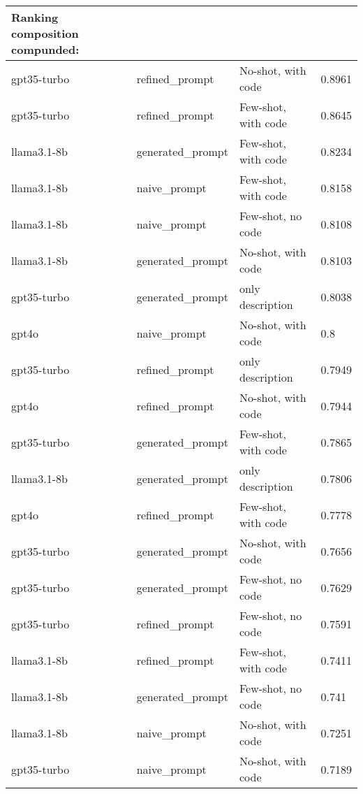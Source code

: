 \documentclass[a4paper,11pt,oneside]{memoir}
\begin{document}
\begin{table}[!ht]
    \centering
    \begin{tabular}{|l|l|l|l|}
    \hline
        Ranking composition compunded: & ~ & ~ & ~ \\ \hline
        gpt35-turbo &  refined\_prompt &  No-shot, with code & 0.8961 \\ \hline
        gpt35-turbo &  refined\_prompt &  Few-shot, with code & 0.8645 \\ \hline
        llama3.1-8b &  generated\_prompt &  Few-shot, with code & 0.8234 \\ \hline
        llama3.1-8b &  naive\_prompt &  Few-shot, with code & 0.8158 \\ \hline
        llama3.1-8b &  naive\_prompt &  Few-shot, no code & 0.8108 \\ \hline
        llama3.1-8b &  generated\_prompt &  No-shot, with code & 0.8103 \\ \hline
        gpt35-turbo &  generated\_prompt &  only description & 0.8038 \\ \hline
        gpt4o &  naive\_prompt &  No-shot, with code & 0.8 \\ \hline
        gpt35-turbo &  refined\_prompt &  only description & 0.7949 \\ \hline
        gpt4o &  refined\_prompt &  No-shot, with code & 0.7944 \\ \hline
        gpt35-turbo &  generated\_prompt &  Few-shot, with code & 0.7865 \\ \hline
        llama3.1-8b &  generated\_prompt &  only description & 0.7806 \\ \hline
        gpt4o &  refined\_prompt &  Few-shot, with code & 0.7778 \\ \hline
        gpt35-turbo &  generated\_prompt &  No-shot, with code & 0.7656 \\ \hline
        gpt35-turbo &  generated\_prompt &  Few-shot, no code & 0.7629 \\ \hline
        gpt35-turbo &  refined\_prompt &  Few-shot, no code & 0.7591 \\ \hline
        llama3.1-8b &  refined\_prompt &  Few-shot, with code & 0.7411 \\ \hline
        llama3.1-8b &  generated\_prompt &  Few-shot, no code & 0.741 \\ \hline
        llama3.1-8b &  naive\_prompt &  No-shot, with code & 0.7251 \\ \hline
        gpt35-turbo &  naive\_prompt &  No-shot, with code & 0.7189 \\ \hline

\end{tabular}
\end{table}
\end{document}
